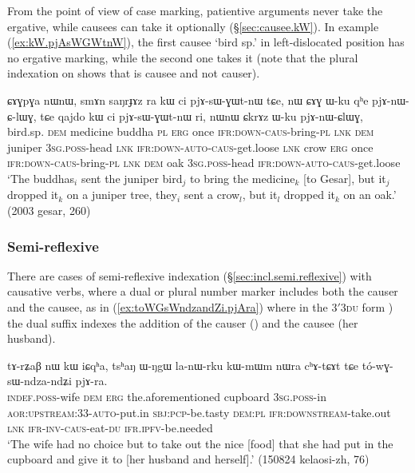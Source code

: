 From the point of view of case marking, patientive arguments never take the ergative, while causees can take it optionally (§\ref{sec:causee.kW}). In example  (\ref{ex:kW.pjAsWGWtnW}), the first causee  `bird sp.' in left-dislocated position has no ergative marking, while the second one  takes it (note that the plural indexation on  shows that  is causee and not causer).
 
\begin{exe}
\ex \label{ex:kW.pjAsWGWtnW}
\gll ɕɤɣpɣa nɯnɯ, smɤn saŋrɟɤz ra kɯ ci pjɤ-sɯ-ɣɯt-nɯ tɕe, nɯ ɕɤɣ ɯ-ku qʰe pjɤ-nɯ-ɕ-lɯɣ, tɕe qajdo kɯ ci pjɤ-sɯ-ɣɯt-nɯ ri, nɯnɯ ɕkrɤz ɯ-ku pjɤ-nɯ-ɕlɯɣ, \\
bird.sp. \textsc{dem} medicine buddha \textsc{pl} \textsc{erg} once \textsc{ifr}:\textsc{down}-\textsc{caus}-bring-\textsc{pl} \textsc{lnk} \textsc{dem} juniper \textsc{3sg}.\textsc{poss}-head \textsc{lnk} \textsc{ifr}:\textsc{down}-\textsc{auto}-\textsc{caus}-get.loose \textsc{lnk} crow \textsc{erg} once \textsc{ifr}:\textsc{down}-\textsc{caus}-bring-\textsc{pl} \textsc{lnk} \textsc{dem} oak \textsc{3sg}.\textsc{poss}-head  \textsc{ifr}:\textsc{down}-\textsc{auto}-\textsc{caus}-get.loose  \\
\glt `The buddhas$_i$ sent the juniper bird$_j$ to bring the medicine$_k$ [to Gesar], but it$_j$  dropped it$_k$ on a juniper tree, they$_i$ sent a crow$_l$, but it$_l$ dropped it$_k$ on an oak.' (2003 gesar, 260)
\end{exe}

\subsubsection{Semi-reflexive} \label{sec:sig.caus.semi.reflexive}
There are cases of semi-reflexive indexation (§\ref{sec:incl.semi.reflexive}) with causative verbs, where a dual or plural number marker includes both the causer and the causee, as in (\ref{ex:toWGsWndzandZi.pjAra}) where in the 3$'$\fl{}\textsc{3du} form ) the dual suffix indexes the addition of the causer () and the causee (her husband).

\begin{exe}
\ex \label{ex:toWGsWndzandZi.pjAra}
\gll tɤ-rʑaβ nɯ kɯ iɕqʰa, tsʰaŋ ɯ-ŋgɯ la-nɯ-rku kɯ-mɯm nɯra cʰɤ-tɕɤt tɕe tó-wɣ-sɯ-ndza-ndʑi pjɤ-ra. \\
\textsc{indef}.\textsc{poss}-wife \textsc{dem} \textsc{erg} the.aforementioned cupboard \textsc{3sg}.\textsc{poss}-in \textsc{aor}:\textsc{upstream}:3\fl{}3-\textsc{auto}-put.in \textsc{sbj}:\textsc{pcp}-be.tasty \textsc{dem}:\textsc{pl} \textsc{ifr}:\textsc{downstream}-take.out \textsc{lnk} \textsc{ifr}-\textsc{inv}-\textsc{caus}-eat-\textsc{du} \textsc{ifr}.\textsc{ipfv}-be.needed \\
\glt `The wife had no choice but to take out the nice [food] that she had put in the cupboard and give it to [her husband and herself].' (150824 kelaosi-zh, 76)
\end{exe}

